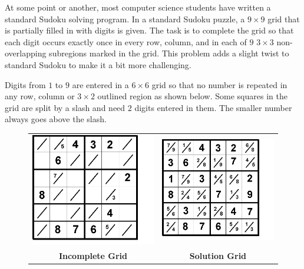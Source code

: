 
At some point or another, most computer science students have written a standard Sudoku solving
program.  
In a standard Sudoku puzzle, a $9 \times 9$ grid that is partially filled in with digits is given.
The task is to complete the grid so that each digit occurs exactly once in every row, column,
and in each of $9$ $3 \times 3$ non-overlapping subregions marked in the grid.
This problem adds a slight twist to standard Sudoku to make it a bit more challenging.

Digits from $1$ to $9$ are entered in a $6 \times 6$ grid so that no number is repeated in any row, column 
or $3 \times 2$ outlined region as shown below. Some squares in the grid are split by a slash and need 
$2$ digits entered in them. The smaller number always goes above the slash.

\begin{figure}[!h]
\begin{center}
    \begin{tabular}{cc}
        \includegraphics[width=.75\textwidth]{tfs-001.png} &
        \includegraphics[width=.75\textwidth]{tfs-002.png} \\
        \textbf{Incomplete Grid} &
        \textbf{Solution Grid} \\
    \end{tabular}
\end{center}
\end{figure}

